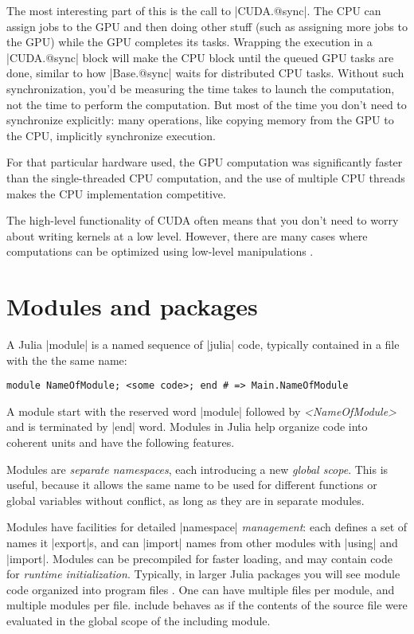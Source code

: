 The most interesting part of this is the call to |CUDA.@sync|. The CPU can assign jobs to the GPU and then doing other stuff (such as assigning more jobs to the GPU) while the GPU completes its tasks. Wrapping the execution in a |CUDA.@sync| block will make the CPU block until the queued GPU tasks are done, similar to how |Base.@sync| waits for distributed CPU tasks. 
Without such synchronization, you'd be measuring the time takes to launch the computation, not the time to perform the computation. But most of the time you don't need to synchronize explicitly: many operations, like copying memory from the GPU to the CPU, implicitly synchronize execution.

For that particular hardware used, the GPU computation was significantly faster than the single-threaded CPU computation, and the use of multiple CPU threads makes the CPU implementation competitive. 

The high-level functionality of CUDA often means that you don't need to worry about writing kernels at a low level. However, there are many cases where computations can be optimized using low-level manipulations \cite{JuliaGPU:gentle}. 

\section{Modules and packages}\label{sect:1-6}

A Julia |module| is a named sequence of |julia| code, typically contained in a file with the the same name: 
\begin{lstlisting}[language=JuliaLocal, style=julia]
  module NameOfModule; <some code>; end # => Main.NameOfModule 
\end{lstlisting}

A module start with the reserved word |module| followed by \emph{<NameOfModule>} and is terminated by |end| word.
Modules in Julia help organize code into coherent units and have the following features.

Modules are \emph{separate namespaces}, each introducing a new \emph{global scope}. This is useful, because it allows the same name to be used for different functions or global variables without conflict, as long as they are in separate modules.

Modules have facilities for detailed |namespace| \emph{management}: each defines a set of names it |export|s, and can |import| names from other modules with |using| and |import|.
Modules can be precompiled for faster loading, and may contain code for \emph{runtime initialization}. Typically, in larger Julia packages you will see module code organized into program files \cite{julia:modules}. One can have multiple files per module, and multiple modules per file. include behaves as if the contents of the source file were evaluated in the global scope of the including module.

